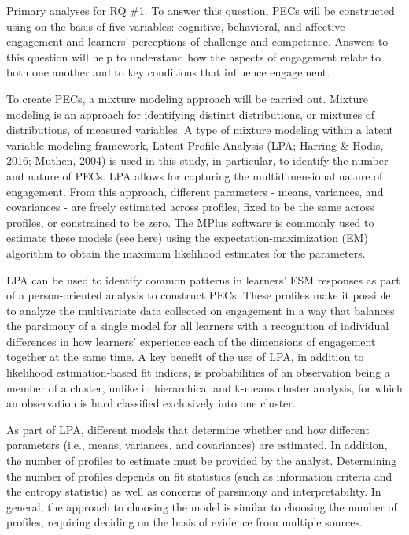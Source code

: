 \documentclass[]{msu-thesis}
\theoremstyle{definition}
\theoremstyle{definition}
\theoremstyle{definition}
\theoremstyle{remark}
\begin{document}
Primary analyses for RQ \#1. To answer this question, PECs will be
constructed using on the basis of five variables: cognitive, behavioral,
and affective engagement and learners' perceptions of challenge and
competence. Answers to this question will help to understand how the
aspects of engagement relate to both one another and to key conditions
that influence engagement.

To create PECs, a mixture modeling approach will be carried out. Mixture
modeling is an approach for identifying distinct distributions, or
mixtures of distributions, of measured variables. A type of mixture
modeling within a latent variable modeling framework, Latent Profile
Analysis (LPA; Harring \& Hodis, 2016; Muthen, 2004) is used in this
study, in particular, to identify the number and nature of PECs. LPA
allows for capturing the multidimensional nature of engagement. From
this approach, different parameters - means, variances, and covariances
- are freely estimated across profiles, fixed to be the same across
profiles, or constrained to be zero. The MPlus software is commonly used
to estimate these models (see
\href{https://www.statmodel.com/examples/mixture.shtml}{here}) using the
expectation-maximization (EM) algorithm to obtain the maximum likelihood
estimates for the parameters.

LPA can be used to identify common patterns in learners' ESM responses
as part of a person-oriented analysis to construct PECs. These profiles
make it possible to analyze the multivariate data collected on
engagement in a way that balances the parsimony of a single model for
all learners with a recognition of individual differences in how
learners' experience each of the dimensions of engagement together at
the same time. A key benefit of the use of LPA, in addition to
likelihood estimation-based fit indices, is probabilities of an
observation being a member of a cluster, unlike in hierarchical and
k-means cluster analysis, for which an observation is hard classified
exclusively into one cluster.

As part of LPA, different models that determine whether and how
different parameters (i.e., means, variances, and covariances) are
estimated. In addition, the number of profiles to estimate must be
provided by the analyst. Determining the number of profiles depends on
fit statistics (such as information criteria and the entropy statistic)
as well as concerns of parsimony and interpretability. In general, the
approach to choosing the model is similar to choosing the number of
profiles, requiring deciding on the basis of evidence from multiple
sources.
\end{document}

